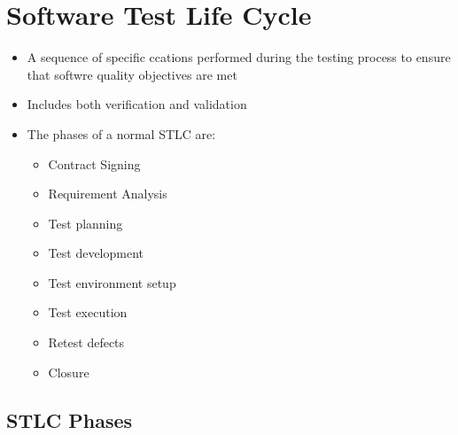 \documentclass{article}
\begin{document}
\section{Software Test Life Cycle}
\begin{itemize}
    \item A sequence of specific ccations performed during the testing process to ensure that softwre quality objectives are met
    
    \item Includes both verification and validation
    
    \item The phases of a normal STLC are:
    \begin{itemize}
        \item Contract Signing
        
        \item Requirement Analysis
        
        \item Test planning
        
        \item Test development
        
        \item Test environment setup
        
        \item Test execution
        
        \item Retest defects
        
        \item Closure
    \end{itemize}
\end{itemize}

\subsection{STLC Phases}
\end{document}
